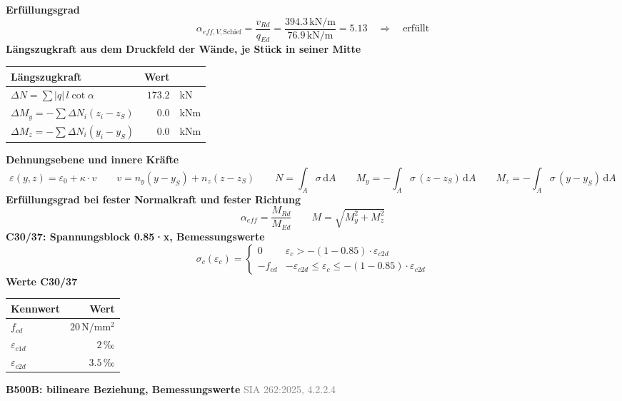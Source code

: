 \documentclass[11pt,a4paper]{article}
\newcommand{\normref}[1]{{\small\textcolor{gray}{#1}}}
\begin{document}
\noindent\textbf{Erfüllungsgrad}
\begin{equation*}
\alpha_{eff,V,\text{Schief}} = \frac{v_{Rd}}{q_{Ed}} = \frac{394.3\,\mathrm{kN}/\mathrm{m}}{76.9\,\mathrm{kN}/\mathrm{m}} = 5.13 \quad \Rightarrow \quad \text{erfüllt}
\end{equation*}
\noindent\textbf{Längszugkraft aus dem Druckfeld der Wände, je Stück in seiner Mitte}
\begin{longtable}{lrl}
\hline
Längszugkraft & Wert &  \\
\hline
\endhead
$\Delta N = \sum |q|\, l \cot\alpha$ & $173.2$ & kN \\
$\Delta M_y = -\sum \Delta N_i (z_i - z_S)$ & $0.0$ & kNm \\
$\Delta M_z = -\sum \Delta N_i (y_i - y_S)$ & $0.0$ & kNm \\
\hline
\end{longtable}
\noindent\textbf{Dehnungsebene und innere Kräfte}
\begin{equation*}
\varepsilon(y, z) = \varepsilon_0 + \kappa \cdot v \qquad v = n_y (y - y_S) + n_z (z - z_S) \qquad N = \int_A \sigma\,\mathrm{d}A \qquad M_y = -\int_A \sigma\,(z - z_S)\,\mathrm{d}A \qquad M_z = -\int_A \sigma\,(y - y_S)\,\mathrm{d}A
\end{equation*}
\noindent\textbf{Erfüllungsgrad bei fester Normalkraft und fester Richtung}
\begin{equation*}
\alpha_{eff} = \frac{M_{Rd}}{M_{Ed}} \qquad M = \sqrt{M_y^2 + M_z^2}
\end{equation*}
\noindent\textbf{C30/37: Spannungsblock 0.85·x, Bemessungswerte}
\begin{equation*}
\sigma_c(\varepsilon_c) = \begin{cases} 0 & \varepsilon_c > -(1 - 0.85) \cdot \varepsilon_{c2d} \\[1ex] -f_{cd} & -\varepsilon_{c2d} \le \varepsilon_c \le -(1 - 0.85) \cdot \varepsilon_{c2d} \end{cases}
\end{equation*}
\noindent\textbf{Werte C30/37}
\begin{longtable}{lr}
\hline
Kennwert & Wert \\
\hline
\endhead
$f_{cd}$ & $20\,\mathrm{N}/\mathrm{mm}^{2}$ \\
$\varepsilon_{c1d}$ & $2\,\text{‰}$ \\
$\varepsilon_{c2d}$ & $3.5\,\text{‰}$ \\
\hline
\end{longtable}
\noindent\textbf{B500B: bilineare Beziehung, Bemessungswerte} \hfill \normref{SIA 262:2025, 4.2.2.4}
\end{document}

